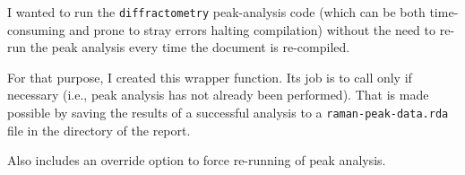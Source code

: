 I wanted to run the \texttt{diffractometry} peak-analysis code (which can be both time-consuming and prone to stray errors halting compilation) without the need to re-run the peak analysis every time the document is re-compiled.

For that purpose, I created this wrapper function.
Its job is to call  only if necessary (i.e., peak analysis has not already been performed). That is made possible by saving the results of a successful analysis to a \texttt{raman-peak-data.rda} file in the directory of the report.

Also includes an override option to force re-running of peak analysis.
